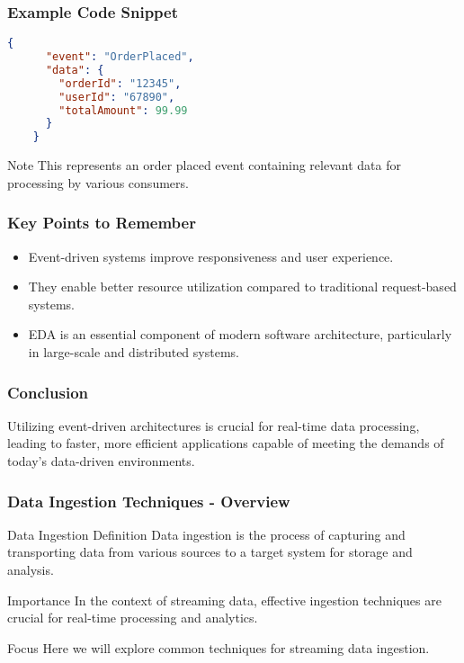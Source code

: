 \documentclass[aspectratio=169]{beamer}
\begin{document}
\begin{frame}[fragile]
    \frametitle{Example Code Snippet}
    \begin{lstlisting}[language=json]
    {
      "event": "OrderPlaced",
      "data": {
        "orderId": "12345",
        "userId": "67890",
        "totalAmount": 99.99
      }
    }
    \end{lstlisting}
    \begin{block}{Note}
        This represents an order placed event containing relevant data for processing by various consumers.
    \end{block}
\end{frame}

\begin{frame}[fragile]
    \frametitle{Key Points to Remember}
    \begin{itemize}
        \item Event-driven systems improve responsiveness and user experience.
        \item They enable better resource utilization compared to traditional request-based systems.
        \item EDA is an essential component of modern software architecture, particularly in large-scale and distributed systems.
    \end{itemize}
\end{frame}

\begin{frame}[fragile]
    \frametitle{Conclusion}
    Utilizing event-driven architectures is crucial for real-time data processing, leading to faster, more efficient applications capable of meeting the demands of today’s data-driven environments.
\end{frame}

\begin{frame}[fragile]
    \frametitle{Data Ingestion Techniques - Overview}
    \begin{block}{Data Ingestion Definition}
        Data ingestion is the process of capturing and transporting data from various sources to a target system for storage and analysis. 
    \end{block}
    \begin{block}{Importance}
        In the context of streaming data, effective ingestion techniques are crucial for real-time processing and analytics.
    \end{block}
    \begin{block}{Focus}
        Here we will explore common techniques for streaming data ingestion.
    \end{block}
\end{frame}
\end{document}
